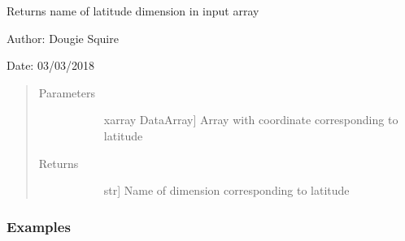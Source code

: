 \documentclass[letterpaper,10pt,english]{sphinxmanual}
\begin{document}
\begin{fulllineitems}
\label{\detokenize{utils_doc:utils.get_lat_name}}
Returns name of latitude dimension in input array

\begin{DUlineblock}{0em}
\item[] Author: Dougie Squire
\item[] Date: 03/03/2018
\end{DUlineblock}
\begin{quote}\begin{description}
\item[{Parameters}] \leavevmode\begin{description}
\item[{}] \leavevmode{[}xarray DataArray{]}
Array with coordinate corresponding to latitude

\end{description}

\item[{Returns}] \leavevmode\begin{description}
\item[{}] \leavevmode{[}str{]}
Name of dimension corresponding to latitude

\end{description}

\end{description}\end{quote}
\subsubsection*{Examples}


\end{fulllineitems}
\end{document}
